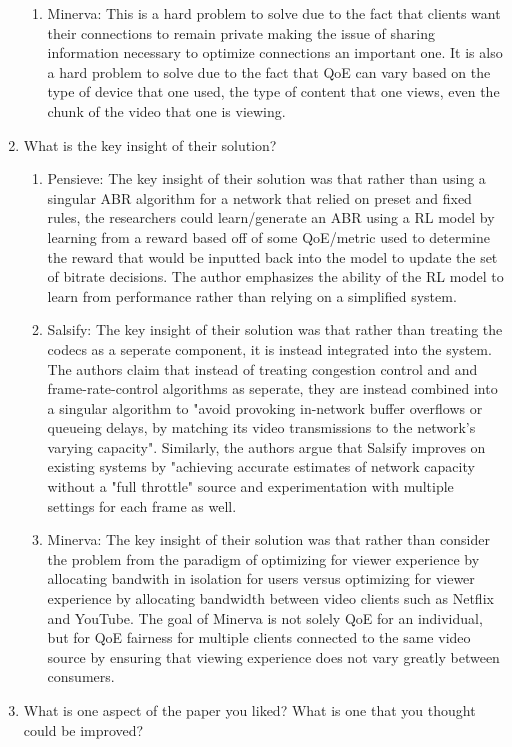 \documentclass[10pt]{article}
\begin{document}
\begin{enumerate}
\begin{enumerate}
        \item Minerva: This is a hard problem to solve due to the fact that clients want their connections to remain private making the issue of sharing information necessary to optimize connections an important one. It is also a hard problem to solve due to the fact that QoE can vary based on the type of device that one used, the type of content that one views, even the chunk of the video that one is viewing.
    \end{enumerate}
    \item What is the key insight of their solution? \begin{enumerate}
        \item Pensieve: The key insight of their solution was that rather than using a singular ABR algorithm for a network that relied on preset and fixed rules, the researchers could learn/generate an ABR using a RL model by learning from a reward based off of some QoE/metric used to determine the reward that would be inputted back into the model to update the set of bitrate decisions. The author emphasizes the ability of the RL model to learn from performance rather than relying on a simplified system.
        \item Salsify: The key insight of their solution was that rather than treating the codecs as a seperate component, it is instead integrated into the system. The authors claim that instead of treating congestion control and and frame-rate-control algorithms as seperate, they are instead combined into a singular algorithm to "avoid provoking in-network buffer overflows or queueing delays, by matching its video transmissions to the network's varying capacity". Similarly, the authors argue that Salsify improves on existing systems by "achieving accurate estimates of network capacity without a "full throttle" source and experimentation with multiple settings for each frame as well.
        \item Minerva: The key insight of their solution was that rather than consider the problem from the paradigm of optimizing for viewer experience by allocating bandwith in isolation for users versus optimizing for viewer experience by allocating bandwidth between video clients such as Netflix and YouTube. The goal of Minerva is not solely QoE for an individual, but for QoE fairness for multiple clients connected to the same video source by ensuring that viewing experience does not vary greatly between consumers.
    \end{enumerate}
    \item What is one aspect of the paper you liked? What is one that you thought could be improved? \begin{enumerate}

\end{enumerate}
\end{enumerate}
\end{document}
